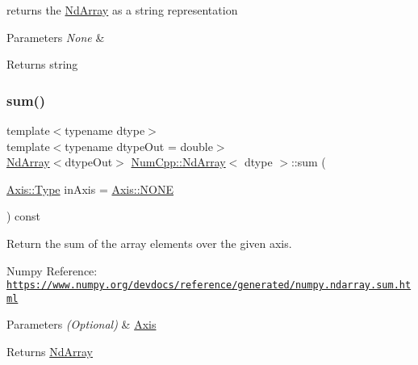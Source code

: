 returns the \mbox{\hyperlink{class_num_cpp_1_1_nd_array}{Nd\+Array}} as a string representation


\begin{DoxyParams}{Parameters}
{\em None} & \\
\hline
\end{DoxyParams}
\begin{DoxyReturn}{Returns}
string 
\end{DoxyReturn}
\mbox{\label{class_num_cpp_1_1_nd_array_a6952d83d0f935223e2b6b63c8a84f18c}} 
\subsubsection{\texorpdfstring{sum()}{sum()}}
{\footnotesize\ttfamily template$<$typename dtype$>$ \\
template$<$typename dtype\+Out  = double$>$ \\
\mbox{\hyperlink{class_num_cpp_1_1_nd_array}{Nd\+Array}}$<$dtype\+Out$>$ \mbox{\hyperlink{class_num_cpp_1_1_nd_array}{Num\+Cpp\+::\+Nd\+Array}}$<$ dtype $>$\+::sum (\begin{DoxyParamCaption}\item[{\mbox{\hyperlink{struct_num_cpp_1_1_axis_ac10eb76f8631762d9ed70c40c42ca6cb}{Axis\+::\+Type}}}]{in\+Axis = {\ttfamily \mbox{\hyperlink{struct_num_cpp_1_1_axis_ac10eb76f8631762d9ed70c40c42ca6cba747ae657022cca1d87702b56d0c038e9}{Axis\+::\+N\+O\+NE}}} }\end{DoxyParamCaption}) const\hspace{0.3cm}{\ttfamily [inline]}}

Return the sum of the array elements over the given axis.

Numpy Reference\+: \href{https://www.numpy.org/devdocs/reference/generated/numpy.ndarray.sum.html}{\tt https\+://www.\+numpy.\+org/devdocs/reference/generated/numpy.\+ndarray.\+sum.\+html}


\begin{DoxyParams}{Parameters}
{\em (\+Optional)} & \mbox{\hyperlink{struct_num_cpp_1_1_axis}{Axis}} \\
\hline
\end{DoxyParams}
\begin{DoxyReturn}{Returns}
\mbox{\hyperlink{class_num_cpp_1_1_nd_array}{Nd\+Array}} 
\end{DoxyReturn}
\mbox{\label{class_num_cpp_1_1_nd_array_a7f669c50940c145fc36e3f6772c2df94}} 
